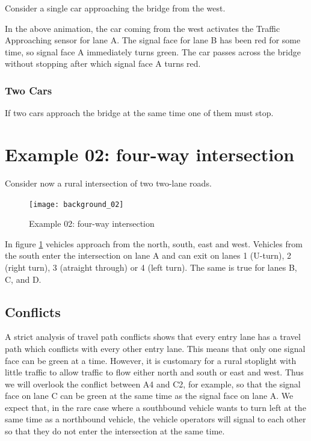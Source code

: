 \documentclass[letterpaper,twoside]{article}
\begin{document}
Consider a single car approaching the bridge from the west.

\noindent{}

In the above animation, the car coming from the west activates the Traffic
Approaching sensor for lane A.  The signal face for lane B has been red
for some time, so signal face A immediately turns green.  The car passes
across the bridge without stopping after which signal face A turns red.

\subsubsection{Two Cars}

If two cars approach the bridge at the same time one of them must stop.

\noindent{}

\section{Example 02: four-way intersection}

Consider now a rural intersection of two two-lane roads.

\begin{figure}[htb]
  {\texttt{[image: background\_02]}}
  {\caption{Example 02: four-way intersection}
    \label{fig:four-way_intersection}}
\end{figure}

In figure \ref{fig:four-way_intersection} vehicles approach from the
north, south, east and west.  Vehicles from the south enter the intersection
on lane A and can exit on lanes 1 (U-turn), 2 (right turn), 3 (atraight
through) or 4 (left turn).  The same is true for lanes B, C, and D.

\subsection{Conflicts}

A strict analysis of travel path conflicts shows that every entry lane
has a travel path which conflicts with every other entry lane.  This means
that only one signal face can be green at a time.
However, it is customary for a rural stoplight with little traffic to allow
traffic to flow either north and south or east and west.  
Thus we will overlook the conflict between A4 and C2, for example, so
that the signal face on lane C can be green at the same time as the
signal face on lane A.  We expect that, in the rare case where a southbound
vehicle wants to turn left at the same time as a northbound vehicle,
the vehicle operators will signal to each other so that they do not
enter the intersection at the same time.
\end{document}

